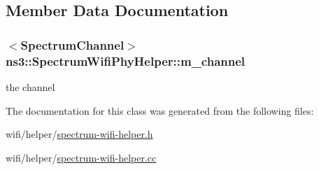 \subsection{Member Data Documentation}
\subsubsection[{\texorpdfstring{m\+\_\+channel}{m_channel}}]{$<${\bf Spectrum\+Channel}$>$ ns3\+::\+Spectrum\+Wifi\+Phy\+Helper\+::m\+\_\+channel\hspace{0.3cm}{\ttfamily [private]}}\hypertarget{classns3_1_1SpectrumWifiPhyHelper_a9b86dafa521bb6bdab424da7d5e0e4c4}{}\label{classns3_1_1SpectrumWifiPhyHelper_a9b86dafa521bb6bdab424da7d5e0e4c4}


the channel 



The documentation for this class was generated from the following files\+:\begin{DoxyCompactItemize}
\item 
wifi/helper/\hyperlink{spectrum-wifi-helper_8h}{spectrum-\/wifi-\/helper.\+h}\item 
wifi/helper/\hyperlink{spectrum-wifi-helper_8cc}{spectrum-\/wifi-\/helper.\+cc}\end{DoxyCompactItemize}
